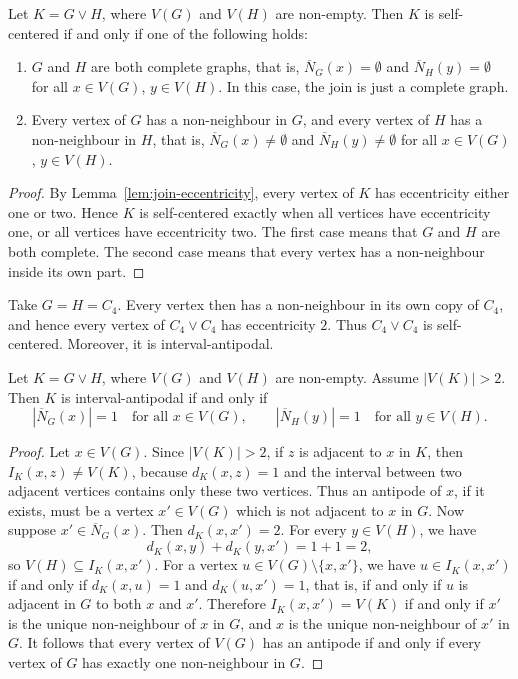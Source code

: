 \documentclass[a4paper,leqno]{amsart}
\begin{document}
\begin{cor}\label{cor:join-self-centered}
Let $K=G\vee H$, where $V(G)$ and $V(H)$ are non-empty. Then $K$ is
self-centered if and only if one of the following holds:
\begin{enumerate}
    \item $G$ and $H$ are both complete graphs, that is, $\overline N_G(x)=\emptyset$ and $\overline N_H(y)=\emptyset$ for all $x\in V(G)$, $y\in V(H)$. In this case, the join is just a complete graph.
    \item Every vertex of $G$ has a non-neighbour in $G$, and every
    vertex of $H$ has a non-neighbour in $H$, that is, $\overline N_G(x)\neq\emptyset$ and $\overline N_H(y)\neq\emptyset$ for all $x\in V(G)$, $y\in V(H)$.
\end{enumerate}
\end{cor}

\begin{proof}
By Lemma~\ref{lem:join-eccentricity}, every vertex of $K$ has eccentricity either one or two. Hence $K$ is self-centered exactly when all vertices have eccentricity one, or all vertices have eccentricity two. The first case means that $G$ and $H$ are both complete. The second case means that every vertex has a non-neighbour inside its own part.
\end{proof}

\begin{eg}
Take $G=H=C_4$. Every vertex then has a non-neighbour in its own copy of $C_4$, and hence every vertex of $C_4\vee C_4$ has eccentricity $2$. Thus $C_4\vee C_4$ is self-centered. Moreover, it is interval-antipodal.
\end{eg}
    
\begin{lem}\label{lem:join-interval-antipodal}
Let $K=G\vee H$, where $V(G)$ and $V(H)$ are non-empty. Assume
$|V(K)|>2$. Then $K$ is interval-antipodal if and only if $$
|\overline N_G(x)|=1\quad\text{for all }x\in V(G), \qquad|\overline N_H(y)|=1\quad\text{for all }y\in V(H).$$
\end{lem}

\begin{proof}
Let $x\in V(G)$. Since $|V(K)|>2$, if $z$ is adjacent to $x$ in $K$,
then $I_K(x,z)\neq V(K)$, because $d_K(x,z)=1$ and the interval between
two adjacent vertices contains only these two vertices. Thus an antipode of $x$, if it exists, must be a vertex $x'\in V(G)$ which is not adjacent to $x$ in $G$. Now suppose $x'\in \overline N_G(x)$. Then $d_K(x,x')=2$. For every $y\in V(H)$, we have
$$d_K(x,y)+d_K(y,x')=1+1=2,$$
so $V(H)\subseteq I_K(x,x')$. For a vertex $u\in V(G)\setminus\{x,x'\}$,
we have $u\in I_K(x,x')$ if and only if $d_K(x,u)=1$ and $d_K(u,x')=1$, that is, if and only if $u$ is adjacent in $G$ to both $x$ and $x'$. Therefore $I_K(x,x')=V(K)$ if and only if $x'$ is the unique non-neighbour of $x$ in $G$, and $x$ is the unique non-neighbour of $x'$ in $G$. It follows that every vertex of $V(G)$ has an antipode if and only if every vertex of $G$ has exactly one non-neighbour in $G$.
\end{proof}
\end{document}
